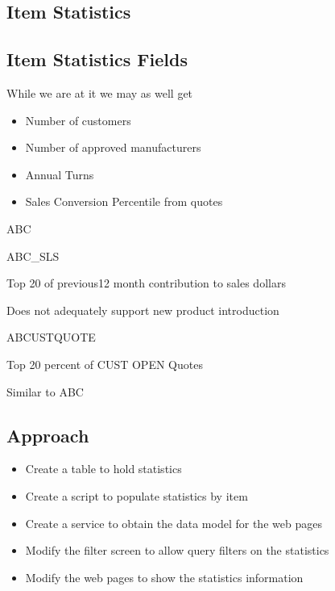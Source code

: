 \documentclass[letterpaper,10pt,english]{sphinxmanual}
\begin{document}


\subsection{Item Statistics}
\label{\detokenize{100-ABC:id6}}

\subsection{Item Statistics Fields}
\label{\detokenize{100-ABC:item-statistics-fields}}






While we are at it we may as well get
\begin{itemize}
\item {} 
Number of customers

\item {} 
Number of approved manufacturers

\item {} 
Annual Turns

\item {} 
Sales Conversion Percentile from quotes

\end{itemize}

ABC

ABC\_SLS

Top 20 of previous12 month contribution to sales dollars

Does not adequately support new product introduction

ABCUSTQUOTE

Top 20 percent of CUST OPEN Quotes

Similar to ABC


\subsection{Approach}
\label{\detokenize{100-ABC:id7}}\begin{itemize}
\item {} 
Create a table to hold statistics

\item {} 
Create a script to populate statistics by item

\item {} 
Create a service to obtain the data model for the web pages

\item {} 
Modify the filter screen to allow query filters on the statistics

\item {} 
Modify the web pages to show the statistics information

\end{itemize}
\end{document}
